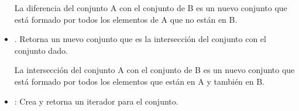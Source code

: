 \begin{definition}[Set]{}
\begin{itemize}
La diferencia del conjunto A  con el conjunto de B es un nuevo conjunto que está formado por todos los elementos de A que no están en B.


\item {}.  Retorna un nuevo conjunto que es la intersección del conjunto con el conjunto dado.

La intersección del conjunto A  con el conjunto de B es un nuevo conjunto que está formado por todos los elementos que están en A y también en B.

\item {}: Crea y retorna un iterador para el conjunto.
\end{itemize}
\end{definition}


